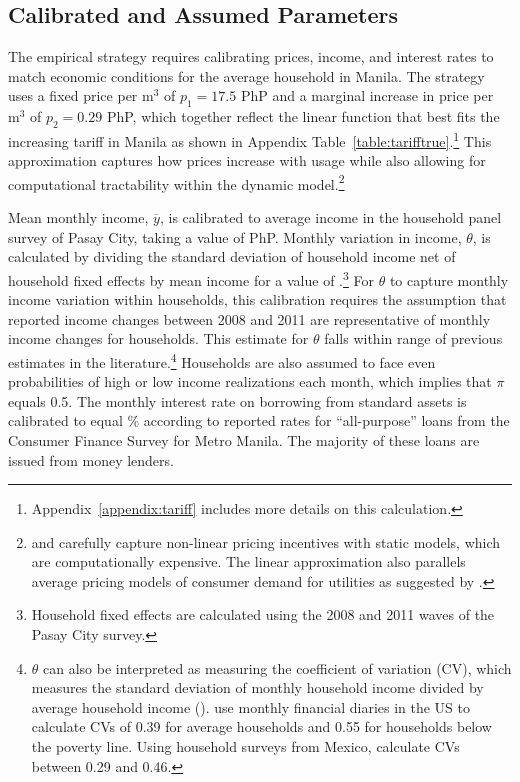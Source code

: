 \documentclass[12pt,table]{article}
\begin{document}
\subsection{Calibrated and Assumed Parameters}

The empirical strategy requires calibrating prices, income, and interest rates to match economic conditions for the average household in Manila.  The strategy uses a fixed price per $\text{m}^{3}$ of $p_1=17.5$ PhP and a marginal increase in price per $\text{m}^{3}$ of $p_2=0.29$ PhP, which together reflect the linear function that best fits the increasing tariff in Manila as shown in Appendix Table~\ref{table:tarifftrue}.\footnote{Appendix~\ref{appendix:tariff} includes more details on this calculation. }  This approximation captures how prices increase with usage while also allowing for computational tractability within the dynamic model.\footnote{\cite{wjv} and \cite{szabo2015value} carefully capture non-linear pricing incentives with static models, which are computationally expensive.  The linear approximation also parallels average pricing models of consumer demand for utilities as suggested by \cite{ito2014consumers}.}  

Mean monthly income, $\overline{y}$, is calibrated to average income in the household panel survey of Pasay City, taking a value of PhP.  Monthly variation in income, $\theta$, is calculated by dividing the standard deviation of household income net of household fixed effects by mean income for a value of \unskip.\footnote{Household fixed effects are calculated using the 2008 and 2011 waves of the Pasay City survey.}  For $\theta$ to capture monthly income variation within households, this calibration requires the assumption that reported income changes between 2008 and 2011 are representative of monthly income changes for households.  This estimate for $\theta$ falls within range of previous estimates in the literature.\footnote{$\theta$ can also be interpreted as measuring the coefficient of variation (CV), which measures the standard deviation of monthly household income divided by average household income (\cite{hannagan2015income}).  \cite{hannagan2015income} use monthly financial diaries in the US to calculate CVs of 0.39 for average households and 0.55 for households below the poverty line.  Using household surveys from Mexico, \cite{amuedo2011remittances} calculate CVs between 0.29 and 0.46.}  Households are also assumed to face even probabilities of high or low income realizations each month, which implies that $\pi$ equals 0.5.  The monthly interest rate on borrowing from standard assets is calibrated to equal \unskip\% according to reported rates for ``all-purpose'' loans from the Consumer Finance Survey for Metro Manila.  The majority of these loans are issued from money lenders.
\end{document}
